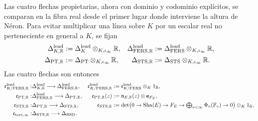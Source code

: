 Las cuatro flechas propietarias, ahora con dominio y codominio explícitos,
se comparan en la fibra real desde el primer lugar donde interviene la
altura de Néron.  Para evitar multiplicar una línea sobre $K$ por un
escalar real no perteneciente en general a $K$, se fijan
\begin{equation}\label{eq:pdf2-bsd-lineas-reales-comparador}
 \begin{aligned}
  \Delta_{K,\mathbb R}^{\rm lead}
    &:=\Delta_K^{\rm lead}\otimes_{K,\iota_\infty}\mathbb R,&
  \Delta_{{\rm FERS},\mathbb R}^{\rm lead}
    &:=\Delta_{\rm FERS}^{\rm lead}\otimes_{K,\iota_\infty}\mathbb R,\\
  \Delta_{{\rm PT},\mathbb R}
    &:=\Delta_{\rm PT}\otimes_{K,\iota_\infty}\mathbb R,&
  \Delta_{{\rm STS},\mathbb R}
    &:=\Delta_{\rm STS}\otimes_{K,\iota_\infty}\mathbb R.
 \end{aligned}
\end{equation}
Las cuatro flechas son entonces
\begin{equation}\label{eq:pdf2-bsd-cuatro-comparadores}
\begin{aligned}
 \mathfrak c_{K/{\rm FERS},\mathbb R}^{\rm lead}:
   &\Delta_{K,\mathbb R}^{\rm lead}
      \longrightarrow\Delta_{{\rm FERS},\mathbb R}^{\rm lead},
 &\mathfrak c_{K/{\rm FERS},\mathbb R}^{\rm lead}
   &:=\mathfrak c_{K/{\rm FERS}}^{\rm lead}\otimes_K1_{\mathbb R},\\
 \mathfrak c_{{\rm PT},\mathbb R}:
   &\Delta_{{\rm FERS},\mathbb R}^{\rm lead}
      \longrightarrow\Delta_{{\rm PT},\mathbb R},
 &\mathfrak c_{{\rm PT},\mathbb R}(z)&:=
   \mathfrak n_{E,\mathbb R}(z)\otimes\mathbf e_{F_E},\\
 \mathfrak c_{{\rm STS},\mathbb R}:
   &\Delta_{{\rm PT},\mathbb R}
      \longrightarrow\Delta_{{\rm STS},\mathbb R},
 &\mathfrak c_{{\rm STS},\mathbb R}&:=\det\bigl(
   0\to\operatorname{Sha}(E)\to F_E
     \to\textstyle\bigoplus_{v<\infty}\Phi_v(\mathbb F_v)
     \to0\bigr)\otimes_K1_{\mathbb R},\\
 \mathfrak c_{\rm tors,\infty}:
   &\Delta_{{\rm STS},\mathbb R}
      \longrightarrow\Delta_{\rm BSD}.&&
\end{aligned}
\end{equation}

